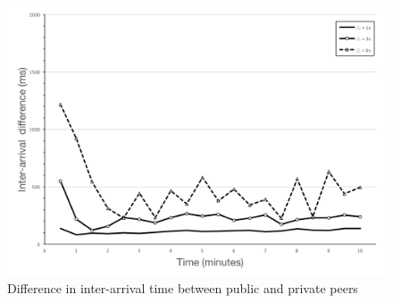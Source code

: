 \begin{figure}[ht]
  \centering
  \includegraphics[keepaspectratio=true, width=\textwidth]{images/interarrivaltime_difference}\caption{Difference in inter-arrival time between public and private peers}
  \label{fig:interarrivaltime_difference}
\end{figure}

